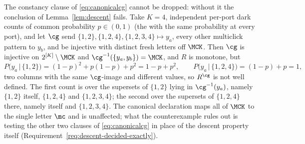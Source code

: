
\begin{remark}
\label{rem:descentneedsconstant}
The constancy clause of \eqref{eq:canonicalcg} cannot be dropped: without it
the conclusion of Lemma~\ref{lem:descent} fails. Take $K=4$, independent
per-port dark counts of common probability $p\in(0,1)$ (the
 with the same probability at every port), and
let $\cg$ send $\{1,2\},\{1,2,4\},\{1,2,3,4\}\mapsto y_a$, every other
multiclick pattern to $y_b$, and be injective with distinct fresh letters off
$\MCK$. Then $\cg$ is injective on $2^{[K]}\setminus\MCK$ and
$\cg^{-1}(\{y_a,y_b\})=\MCK$, and $R$ is monotone, but
\begin{equation*}
  P\big(y_a\,\big|\,\{1,2\}\big)=(1-p)^2+p(1-p)+p^2=1-p+p^2,
  \qquad
  P\big(y_a\,\big|\,\{1,2,4\}\big)=(1-p)+p=1,
\end{equation*}
two columns with the same $\cg$-image and different values, so $R^{\cg}$ is not
well defined. The first count is over the supersets of $\{1,2\}$ lying in
$\cg^{-1}(y_a)$, namely $\{1,2\}$ itself, $\{1,2,4\}$ and $\{1,2,3,4\}$; the
second over the supersets of $\{1,2,4\}$ there, namely itself and
$\{1,2,3,4\}$. The canonical declaration maps all of $\MCK$ to the single
letter $\mc$ and is unaffected; what the counterexample rules out is testing
the other two clauses of \eqref{eq:canonicalcg} in place of the descent
property itself
(Requirement~\ref{req:descent-decided-exactly}).
\end{remark}
